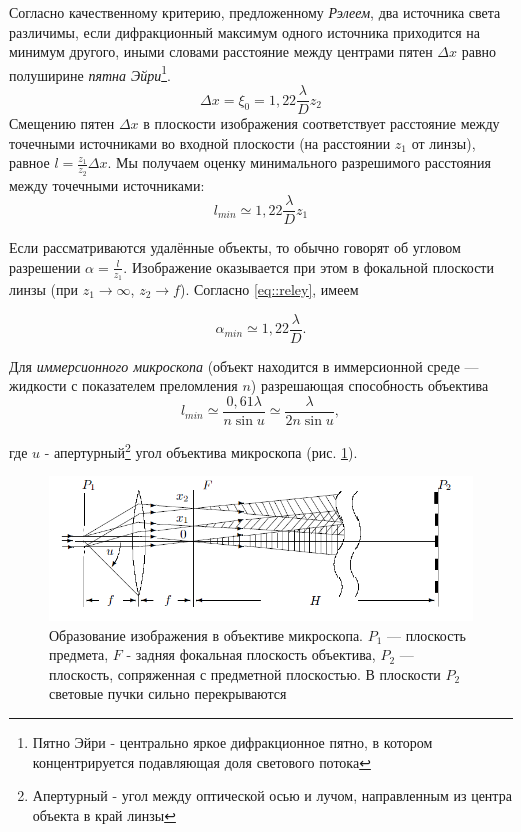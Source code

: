 \documentclass[12pt]{article}
\begin{document}
		Согласно качественному критерию, предложенному \textit{Рэлеем}, два источника света различимы, если дифракционный максимум одного источника приходится на минимум другого, иными словами расстояние между центрами пятен $\Delta x$ равно полуширине \textit{пятна Эйри}\footnote{Пятно Эйри - центрально яркое дифракционное пятно, в котором концентрируется подавляющая доля светового потока}.
		\begin{equation}\label{eq::reley}
		\Delta x = \xi_0 = 1,22\frac{\lambda}{D}z_2
		\end{equation}
		Смещению пятен $\Delta x$ в плоскости изображения соответствует расстояние между точечными источниками во входной плоскости (на расстоянии $z_1$ от линзы), равное $l =\frac{z_1}{z_2}\Delta x$. Мы получаем оценку минимального разрешимого расстояния между точечными источниками:
		\begin{equation}\label{eq::min_l}
		l_{min} \simeq 1,22\dfrac{\lambda}{D}z_1
		\end{equation}
		
		Если рассматриваются удалённые объекты, то обычно говорят об угловом разрешении $\alpha = \frac{l}{z_1}$. Изображение оказывается при этом в фокальной плоскости линзы (при $z_1 \rightarrow \infty$, $z_2 \rightarrow f$). Согласно \eqref{eq::reley}, имеем
		
		\begin{equation}
			\alpha_{min} \simeq 1,22 \dfrac{\lambda}{D}.
		\end{equation}
		
		Для \textit{иммерсионного микроскопа} (объект находится в иммерсионной среде — жидкости с показателем преломления $n$) разрешающая способность объектива
		\begin{equation}
		l_{min} \simeq \dfrac{0,61\lambda}{n\sin u} \simeq \dfrac{\lambda}{2n\sin u},
		\end{equation}
		
		где $u$ - апертурный\footnote{Апертурный - угол между оптической осью и лучом, направленным из центра объекта в край линзы} угол объектива микроскопа (рис. \ref{fig::creation_of_image}).
		\begin{figure}
			\centering
			\includegraphics{1}
			\caption{Образование изображения в объективе микроскопа.
				$P_1$ — плоскость предмета, $F$ - задняя фокальная плоскость объектива,
				$P_2$ — плоскость, сопряженная с предметной плоскостью.
				В плоскости $P_2$ световые пучки сильно
				перекрываются}
			\label{fig::creation_of_image}
		\end{figure}
	
\end{document}
